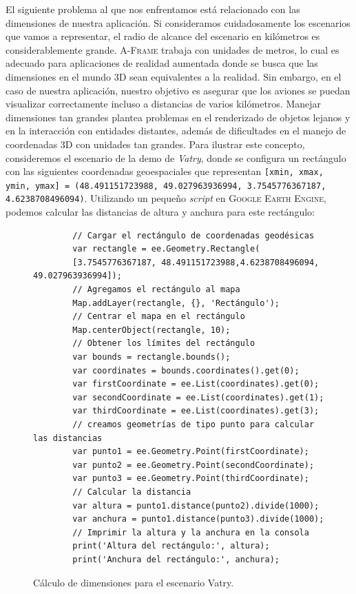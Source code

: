 \documentclass[a4paper, 11pt]{book}
\begin{document}
El siguiente problema al que nos enfrentamos está relacionado con las dimensiones de nuestra aplicación. Si consideramos cuidadosamente los escenarios que vamos a representar, el radio de alcance del escenario en kilómetros es considerablemente grande. \textsc{A-Frame} trabaja con unidades de metros, lo cual es adecuado para aplicaciones de realidad aumentada donde se busca que las dimensiones en el mundo 3D sean equivalentes a la realidad. Sin embargo, en el caso de nuestra aplicación, nuestro objetivo es asegurar que los aviones se puedan visualizar correctamente incluso a distancias de varios kilómetros. Manejar dimensiones tan grandes plantea problemas en el renderizado de objetos lejanos y en la interacción con entidades distantes, además de dificultades en el manejo de coordenadas 3D con unidades tan grandes.
Para ilustrar este concepto, consideremos el escenario de la demo de \emph{Vatry}, donde se configura un rectángulo con las siguientes coordenadas geoespaciales que representan \texttt{[xmin, xmax, ymin, ymax] = (48.491151723988, 49.027963936994, 3.7545776367187, 4.6238708496094)}. Utilizando un pequeño \emph{script} en \textsc{Google Earth Engine}, podemos calcular las distancias de altura y anchura para este rectángulo:
\begin{figure}[H]
	\centering
	\begin{verbatim}
		// Cargar el rectángulo de coordenadas geodésicas
		var rectangle = ee.Geometry.Rectangle(
		[3.7545776367187, 48.491151723988,4.6238708496094, 49.027963936994]);
		// Agregamos el rectángulo al mapa
		Map.addLayer(rectangle, {}, 'Rectángulo');
		// Centrar el mapa en el rectángulo
		Map.centerObject(rectangle, 10);
		// Obtener los límites del rectángulo
		var bounds = rectangle.bounds();
		var coordinates = bounds.coordinates().get(0);
		var firstCoordinate = ee.List(coordinates).get(0);
		var secondCoordinate = ee.List(coordinates).get(1);
		var thirdCoordinate = ee.List(coordinates).get(3);
		// creamos geometrías de tipo punto para calcular las distancias
		var punto1 = ee.Geometry.Point(firstCoordinate);
		var punto2 = ee.Geometry.Point(secondCoordinate);
		var punto3 = ee.Geometry.Point(thirdCoordinate);
		// Calcular la distancia
		var altura = punto1.distance(punto2).divide(1000);
		var anchura = punto1.distance(punto3).divide(1000);
		// Imprimir la altura y la anchura en la consola
		print('Altura del rectángulo:', altura);
		print('Anchura del rectángulo:', anchura);
	\end{verbatim}
	\caption{Cálculo de dimensiones para el escenario Vatry.
		\label{codigo:dimensionesVatry}
	}
\end{figure}
\end{document}
